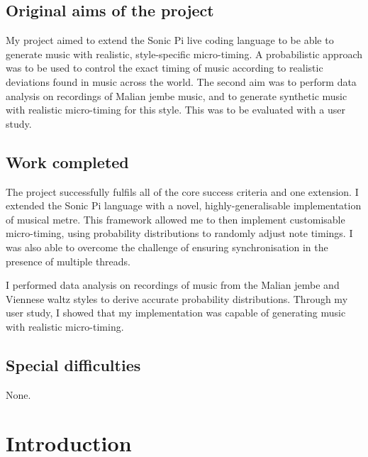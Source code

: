 \documentclass[12pt,twoside,openright]{report}
\begin{document}
\section*{Original aims of the project}

My project aimed to extend the Sonic Pi live coding language to be able to generate music with realistic, style-specific micro-timing. A probabilistic approach was to be used to control the exact timing of music according to realistic deviations found in music across the world. The second aim was to perform data analysis on recordings of Malian jembe music, and to generate synthetic music with realistic micro-timing for this style. This was to be evaluated with a user study.



\section*{Work completed}

The project successfully fulfils all of the core success criteria and one extension. I extended the Sonic Pi language with a novel, highly-generalisable implementation of musical metre. This framework allowed me to then implement customisable micro-timing, using probability distributions to randomly adjust note timings. I was also able to overcome the challenge of ensuring synchronisation in the presence of multiple threads.

I performed data analysis on recordings of music from the Malian jembe and Viennese waltz styles to derive accurate probability distributions. Through my user study, I showed that my implementation was capable of generating music with realistic micro-timing.



\section*{Special difficulties}

None.


 
\newpage
\tableofcontents


\pagestyle{headings}





\chapter{Introduction} \label{introduction}
\end{document}
